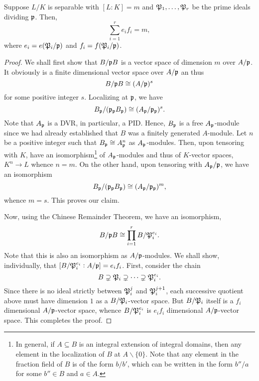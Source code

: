 \begin{theorem}
    Suppose $L/K$ is separable with $[L: K] = m$ and $\mathfrak P_1,\dots,\mathfrak P_r$ be the prime ideals dividing $\mathfrak p$. Then, 
    \begin{equation*}
        \sum_{i = 1}^r e_if_i = m,
    \end{equation*}
    where $e_i = e(\mathfrak P_i/\mathfrak p)$ and $f_i = f(\mathfrak P_i/\mathfrak p)$.
\end{theorem}
\begin{proof}
    We shall first show that $B/\mathfrak p B$ is a vector space of dimension $m$ over $A/\mathfrak p$. It obviously is a finite dimensional vector space over $A/\mathfrak p$ an thus 
    \begin{equation*}
        B/\mathfrak p B\cong (A/\mathfrak p)^s
    \end{equation*}
    for some positive integer $s$. Localizing at $\mathfrak p$, we have 
    \begin{equation*}
        B_\mathfrak p/(\mathfrak p_\mathfrak p B_\mathfrak p)\cong (A_\mathfrak p/\mathfrak p_\mathfrak p)^s.
    \end{equation*}
    Note that $A_\mathfrak p$ is a DVR, in particular, a PID. Hence, $B_\mathfrak p$ is a free $A_\mathfrak p$-module since we had already established that $B$ was a finitely generated $A$-module. Let $n$ be a positive integer such that $B_\mathfrak p\cong A_\mathfrak p^n$ as $A_\mathfrak p$-modules. Then, upon tensoring with $K$, have an isomorphism\footnote{In general, if $A\subseteq B$ is an integral extension of integral domains, then any element in the localization of $B$ at $A\backslash\{0\}$. Note that any element in the fraction field of $B$ is of the form $b/b'$, which can be written in the form $b''/a$ for some $b''\in B$ and $a\in A$.} of $A_\mathfrak p$-modules and thus of $K$-vector spaces, $K^n\longrightarrow L$ whence $n = m$. On the other hand, upon tensoring with $A_\mathfrak p/\mathfrak p$, we have an isomorphism 
    \begin{equation*}
        B_\mathfrak p/(\mathfrak p_\mathfrak p B_\mathfrak p)\cong(A_\mathfrak p/\mathfrak p_\mathfrak p)^m,
    \end{equation*}
    whence $m = s$. This proves our claim.

    Now, using the Chinese Remainder Theorem, we have an isomorphism,
    \begin{equation*}
        B/\mathfrak p B\cong \prod_{i = 1}^r B/\mathfrak P_i^{e_i}.
    \end{equation*}
    Note that this is also an isomorphism as $A/\mathfrak p$-modules. We shall show, individually, that $[B/\mathfrak P_i^{e_i}: A/\mathfrak p] = e_if_i$. First, consider the chain 
    \begin{equation*}
        B\supsetneq\mathfrak P_i\supsetneq\cdots\supsetneq\mathfrak P_i^{e_i}.
    \end{equation*}
    Since there is no ideal strictly between $\mathfrak P_i^j$ and $\mathfrak P_i^{j + 1}$, each successive quotient above must have dimension $1$ as a $B/\mathfrak P_i$-vector space. But $B/\mathfrak P_i$ itself is a $f_i$ dimensional $A/\mathfrak p$-vector space, whence $B/\mathfrak P_i^{e_i}$ is  $e_if_i$ dimensional $A/\mathfrak p$-vector space. This completes the proof.
\end{proof}